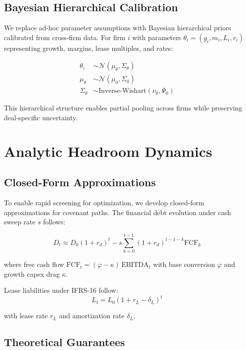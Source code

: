 \documentclass[11pt,a4paper]{article}
\newcommand{\phiFCF}{\varphi}       %
\begin{document}
\subsection{Bayesian Hierarchical Calibration}

We replace ad-hoc parameter assumptions with Bayesian hierarchical priors calibrated from cross-firm data. For firm $i$ with parameters $\theta_i = (g_i, m_i, L_i, r_i)$ representing growth, margins, lease multiples, and rates:

\begin{align}
\theta_i &\sim \mathcal{N}(\mu_{\theta}, \Sigma_{\theta}) \\
\mu_{\theta} &\sim \mathcal{N}(\mu_0, \Sigma_0) \\
\Sigma_{\theta} &\sim \text{Inverse-Wishart}(\nu_0, \Psi_0)
\end{align}

This hierarchical structure enables partial pooling across firms while preserving deal-specific uncertainty.

\section{Analytic Headroom Dynamics}

\subsection{Closed-Form Approximations}

To enable rapid screening for optimization, we develop closed-form approximations for covenant paths. The financial debt evolution under cash sweep rate $s$ follows:

\begin{equation}
D_t \approx D_0(1+r_d)^t - s \sum_{k=0}^{t-1} (1+r_d)^{t-1-k} \text{FCF}_k
\end{equation}

where free cash flow $\text{FCF}_t = (\phiFCF - \kappa)\,\text{EBITDA}_t$ with base conversion $\phiFCF$ and growth capex drag $\kappa$.

Lease liabilities under IFRS-16 follow:
\begin{equation}
L_t = L_0 (1 + r_L - \delta_L)^t
\end{equation}

with lease rate $r_L$ and amortization rate $\delta_L$.

\subsection{Theoretical Guarantees}
\end{document}
